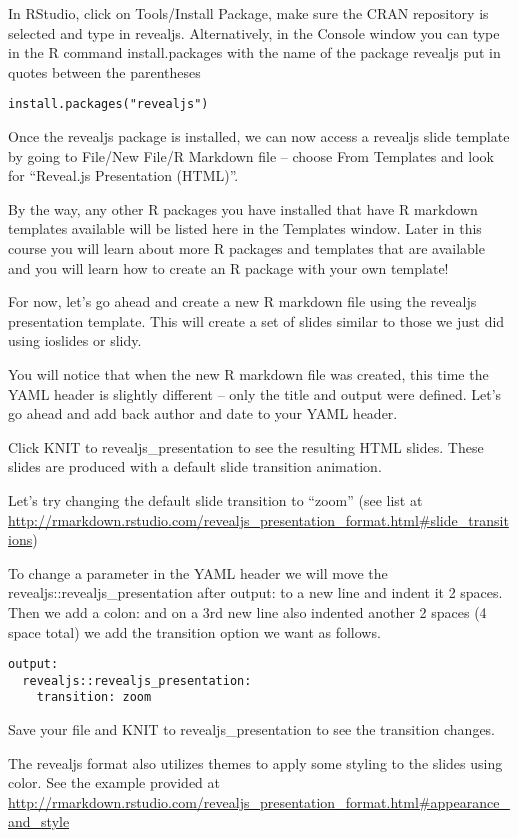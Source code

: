 \documentclass[
]{book}
\begin{document}
In RStudio, click on Tools/Install Package, make sure the CRAN repository is selected and type in revealjs. Alternatively, in the Console window you can type in the R command install.packages with the name of the package revealjs put in quotes between the parentheses

\texttt{install.packages("revealjs")}

Once the revealjs package is installed, we can now access a revealjs slide template by going to File/New File/R Markdown file -- choose From Templates and look for ``Reveal.js Presentation (HTML)''.

By the way, any other R packages you have installed that have R markdown templates available will be listed here in the Templates window. Later in this course you will learn about more R packages and templates that are available and you will learn how to create an R package with your own template!

For now, let's go ahead and create a new R markdown file using the revealjs presentation template. This will create a set of slides similar to those we just did using ioslides or slidy.

You will notice that when the new R markdown file was created, this time the YAML header is slightly different -- only the title and output were defined. Let's go ahead and add back author and date to your YAML header.

Click KNIT to revealjs\_presentation to see the resulting HTML slides. These slides are produced with a default slide transition animation.

Let's try changing the default slide transition to ``zoom'' (see list at \url{http://rmarkdown.rstudio.com/revealjs_presentation_format.html\#slide_transitions})

To change a parameter in the YAML header we will move the revealjs::revealjs\_presentation after output: to a new line and indent it 2 spaces. Then we add a colon: and on a 3rd new line also indented another 2 spaces (4 space total) we add the transition option we want as follows.

\begin{verbatim}
output: 
  revealjs::revealjs_presentation:
    transition: zoom
\end{verbatim}

Save your file and KNIT to revealjs\_presentation to see the transition changes.

The revealjs format also utilizes themes to apply some styling to the slides using color. See the example provided at \url{http://rmarkdown.rstudio.com/revealjs_presentation_format.html\#appearance_and_style}
\end{document}
